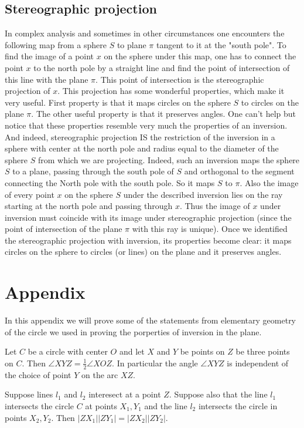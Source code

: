 \subsection{Stereographic projection}
In complex analysis and sometimes in other circumstances one encounters the following map from a sphere $S$ to plane $\pi$ tangent to it at the "south pole". To find the image of a point $x$ on the sphere under this map, one has to connect the point $x$ to the north pole by a straight line and find the point of intersection of this line with the plane $\pi$. This point of intersection is the stereographic projection of $x$.
This projection has some wonderful properties, which make it very useful. First property is that it maps circles on the sphere $S$ to circles on the plane $\pi$. The other useful property is that it preserves angles.
One can't help but notice that these properties resemble very much the properties of an inversion. And indeed, stereographic projection IS the restriction of the inversion in a sphere with center at the north pole and radius equal to the diameter of the sphere $S$ from which we are projecting. Indeed, such an inversion maps the sphere $S$ to a plane, passing through the south pole of $S$ and orthogonal to the segment connecting the North pole with the south pole. So it maps $S$ to $\pi$. Also the image of every point $x$ on the sphere $S$ under the described inversion lies on the ray starting at the north pole and passing through $x$. Thus the image of $x$ under inversion must coincide with its image under stereographic projection (since the point of intersection of the plane $\pi$ with this ray is unique).
Once we identified the stereographic projection with inversion, its properties become clear: it maps circles on the sphere to circles (or lines) on the plane and it preserves angles.
\section{Appendix}
In this appendix we will prove some of the statements from elementary geometry of the circle we used in proving the porperties of inversion in the plane.
\begin{theorem}
Let $C$ be a circle with center $O$ and let $X$ and $Y$ be points on $Z$ be three points on $C$. Then $\angle XYZ=\frac{1}{2} \angle XOZ$. In particular the angle $\angle XYZ$ is independent of the choice of point $Y$ on the arc $XZ$.
\end{theorem}
\begin{theorem}
Suppose lines $l_1$ and $l_2$ interesect at a point $Z$. Suppose also that the line $l_1$ intersects the circle $C$ at points $X_1,Y_1$ and the line $l_2$ intersects the circle in points $X_2,Y_2$. Then $|ZX_1||ZY_1|=|ZX_2||ZY_2|$.
\end{theorem}